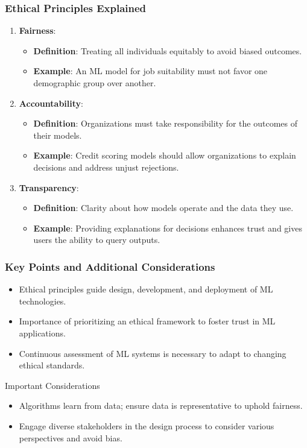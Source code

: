 \documentclass{beamer}
\begin{document}
\begin{frame}[fragile]
    \frametitle{Ethical Principles Explained}
    \begin{enumerate}
        \item \textbf{Fairness}:
            \begin{itemize}
                \item \textbf{Definition}: Treating all individuals equitably to avoid biased outcomes.
                \item \textbf{Example}: An ML model for job suitability must not favor one demographic group over another.
            \end{itemize}
        \item \textbf{Accountability}:
            \begin{itemize}
                \item \textbf{Definition}: Organizations must take responsibility for the outcomes of their models.
                \item \textbf{Example}: Credit scoring models should allow organizations to explain decisions and address unjust rejections.
            \end{itemize}
        \item \textbf{Transparency}:
            \begin{itemize}
                \item \textbf{Definition}: Clarity about how models operate and the data they use.
                \item \textbf{Example}: Providing explanations for decisions enhances trust and gives users the ability to query outputs.
            \end{itemize}
    \end{enumerate}
\end{frame}

\begin{frame}[fragile]
    \frametitle{Key Points and Additional Considerations}
    \begin{itemize}
        \item Ethical principles guide design, development, and deployment of ML technologies.
        \item Importance of prioritizing an ethical framework to foster trust in ML applications.
        \item Continuous assessment of ML systems is necessary to adapt to changing ethical standards.
    \end{itemize}
    \begin{block}{Important Considerations}
        \begin{itemize}
            \item Algorithms learn from data; ensure data is representative to uphold fairness.
            \item Engage diverse stakeholders in the design process to consider various perspectives and avoid bias.
        \end{itemize}
    \end{block}
\end{frame}
\end{document}

